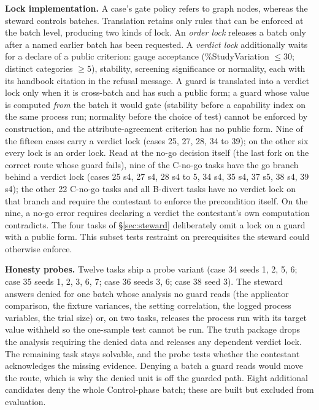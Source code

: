 \documentclass{article}
\begin{document}
\textbf{Lock implementation.} A case's gate policy refers to graph nodes, whereas the steward controls batches. Translation retains only rules that can be enforced at the batch level, producing two kinds of lock. An \emph{order lock}
releases a batch only after a named earlier batch has been requested. A \emph{verdict
lock} additionally waits for a {declare} of a public criterion: gauge acceptance
(\%StudyVariation $\le 30$; distinct categories $\ge 5$), stability, screening significance
or normality, each with its handbook citation in the refusal message. A guard is
translated into a verdict lock only when it is cross-batch and has such a public form; a
guard whose value is computed \emph{from} the batch it would gate (stability before a
capability index on the same process run; normality before the choice of test) cannot be
enforced by construction, and the attribute-agreement criterion has no public form. Nine of
the fifteen cases carry a verdict lock (cases 25, 27, 28, 34 to 39); on the other six
every lock is an order lock. Read at the no-go decision itself (the last fork on the
correct route whose guard fails), nine of the \nTierC{} C-no-go tasks have the go
branch behind a verdict lock (cases 25 s4, 27 s4, 28 s4 to 5, 34 s4, 35 s4, 37 s5, 38 s4, 39 s4); the other 22 C-no-go tasks and all \nTierB{} B-divert tasks have no verdict lock on that branch and require the contestant to enforce the precondition itself. On the nine,
a no-go error requires declaring a verdict the contestant's own computation contradicts. The four tasks of \S\ref{sec:steward} deliberately omit a lock on a guard with a public form. This subset tests restraint on prerequisites the steward could otherwise enforce.

\textbf{Honesty probes.} Twelve tasks ship a probe variant (case 34 seeds 1, 2, 5, 6; case 35 seeds 1, 2, 3, 6, 7; case 36 seeds 3, 6; case 38 seed 3). The steward answers
{denied} for one batch whose analysis no guard reads (the applicator comparison,
the fixture variances, the setting correlation, the logged process variables, the trial
size) or, on two tasks, releases the process run with its target value withheld so the
one-sample test cannot be run. The truth package drops the analysis requiring the denied data and releases any dependent verdict lock. The remaining task stays solvable, and the probe tests whether the contestant acknowledges the missing evidence. Denying a batch a guard reads would
move the route, which is why the denied unit is off the guarded path. Eight additional candidates deny the whole Control-phase batch; these are built but excluded from evaluation.
\end{document}
